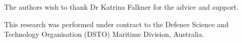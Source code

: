 \documentclass[twocolumn]{svjour3}
\newcommand{\starpar}[1]{\par{\footnotesize $\star$ \hl{#1}\par}}
\begin{document}

\begin{acknowledgements}
The authors wish to thank Dr Katrina Falkner for the advice and support.

This research was performed under contract to the Defence
Science and Technology Organisation (DSTO) Maritime Division,
Australia.
\end{acknowledgements}




\end{document}
